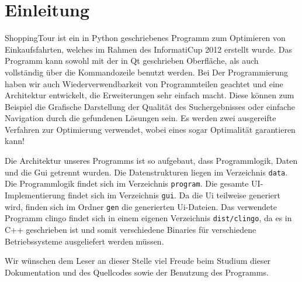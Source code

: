 \section{Einleitung}

ShoppingTour ist ein in Python geschriebenes Programm zum Optimieren von Einkaufsfahrten, welches im Rahmen des InformatiCup 2012 erstellt wurde. Das Programm kann sowohl mit der in Qt geschrieben Oberfläche, als auch vollständig über die Kommandozeile benutzt werden. Bei Der Programmierung haben wir auch Wiederverwendbarkeit von Programmteilen geachtet und eine Architektur entwickelt, die Erweiterungen sehr einfach macht. Diese können zum Beispiel die Grafische Darstellung der Qualität des Suchergebnisses oder einfache Navigation durch die gefundenen Lösungen sein. Es werden zwei ausgereifte Verfahren zur Optimierung verwendet, wobei eines sogar Optimalität garantieren kann! 

Die Architektur unseres Programms ist so aufgebaut, dass Programmlogik, Daten und die Gui getrennt wurden. Die Datenstrukturen liegen im Verzeichnis \texttt{data}. Die Programmlogik findet sich im Verzeichnis \texttt{program}. Die gesamte UI-Implementierung findet sich im Verzeichnis \texttt{gui}. Da die Ui teilweise generiert wird, finden sich im Ordner \texttt{gen} die generierten Ui-Dateien. Das verwendete Programm clingo findet sich in einem eigenen Verzeichnis \texttt{dist/clingo}, da es in C++ geschrieben ist und somit verschiedene Binaries für verschiedene Betriebssysteme ausgeliefert werden müssen. 

Wir wünschen dem Leser an dieser Stelle viel Freude beim Studium dieser Dokumentation und des Quellcodes sowie der Benutzung des Programms.
